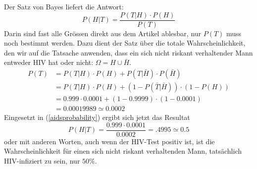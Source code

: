 Der Satz von Bayes liefert die Antwort:
\begin{equation}
P(H|T)=\frac{P(T|H)\cdot P(H)}{P(T)}
\label{aidsprobability}
\end{equation}
Darin sind fast alle Grössen direkt aus dem Artikel ablesbar, nur $P(T)$ muss
noch bestimmt werden.
Dazu dient der Satz über die totale Wahrscheinlichkeit,
den wir auf die Tatsache anwenden, dass ein sich nicht riskant verhaltender
Mann entweder HIV hat oder nicht: $\Omega=H\cup \bar H$.
\begin{align*}
P(T)
&=P(T|H)\cdot P(H)+P(T|\bar H)\cdot P(\bar H)\\
&=P(T|H)\cdot P(H)+(1-P(\bar T|\bar H))\cdot (1 - P(H))\\
&=0.999\cdot 0.0001+(1-0.9999)\cdot(1-0.0001)\\
&=0.00019989\simeq 0.0002
\end{align*}
Eingesetzt in (\ref{aidsprobability}) ergibt sich jetzt das Resultat
\[
P(H|T)=\frac{0.999\cdot 0.0001}{0.0002}=.4995\simeq 0.5
\]
oder mit anderen Worten, auch wenn der HIV-Test positiv ist, ist
die Wahrscheinlichkeit für einen sich nicht riskant verhaltenden Mann,
tatsächlich HIV-infiziert zu sein, nur $50\%$.



